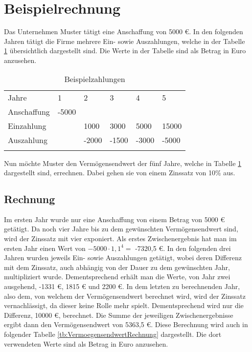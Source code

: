 \section{Beispielrechnung}

Das Unternehmen Muster tätigt eine Anschaffung von 5000 €. In den folgenden Jahren tätigt die Firme mehrere Ein- sowie Auszahlungen, welche in der Tabelle \ref{tb:VermoegensendwertDaten} übersichtlich dargestellt sind. Die Werte in der Tabelle sind als Betrag in Euro anzusehen.

\bigskip

\begin{table}[!h]
    \begin{tabular}{llllll}
        \cline{1-6} \rowcolor{gray}
        Jahre       & 1     & 2     & 3     & 4     & 5     \\ \cline{1-6} \rowcolor{white}
        Anschaffung & -5000 &       &       &       &       \\ \cline{1-6} \rowcolor{white}
        Einzahlung  &       & 1000  & 3000  & 5000  & 15000 \\ \cline{1-6} \rowcolor{white}
        Auszahlung  &       & -2000 & -1500 & -3000 & -5000 \\ \cline{1-6} \rowcolor{white}
    \end{tabular}
    \caption{Beispielzahlungen}
    \label{tb:VermoegensendwertDaten}
\end{table}

\bigskip
\noindent
Nun möchte Muster den Vermögensendwert der fünf Jahre, welche in Tabelle \ref{tb:VermoegensendwertDaten} dargestellt sind, errechnen. Dabei gehen sie von einem Zinssatz von 10\% aus.

\subsection{Rechnung}

Im ersten Jahr wurde nur eine Anschaffung von einem Betrag von 5000 € getätigt. Da noch vier Jahre bis zu dem gewünschten Vermögensendwert sind, wird der Zinssatz mit vier exponiert. Als erstes Zwischenergebnis hat man im ersten Jahr einen Wert von $-5000 \cdot 1,1^4 =$ -7320,5 €. In den folgenden drei Jahren wurden jeweils Ein- sowie Auszahlungen getätigt, wobei deren Differenz mit dem Zinssatz, auch abhängig von der Dauer zu dem gewünschten Jahr, multipliziert wurde. Dementsprechend erhält man die Werte, von Jahr zwei ausgehend, -1331 €, 1815 € und 2200 €. In dem letzten zu berechnenden Jahr, also dem, von welchem der Vermögensendwert berechnet wird, wird der Zinssatz vernachlässigt, da dieser keine Rolle mehr spielt. Dementsprechend wird nur die Differenz, 10000 €, berechnet. Die Summe der jeweiligen Zwischenergebnisse ergibt dann den Vermögensendwert von 5363,5 €. Diese Berechnung wird auch in folgender Tabelle \ref{tb:VermoegensendwertRechnung} dargestellt. Die dort verwendeten Werte sind als Betrag in Euro anzusehen.


